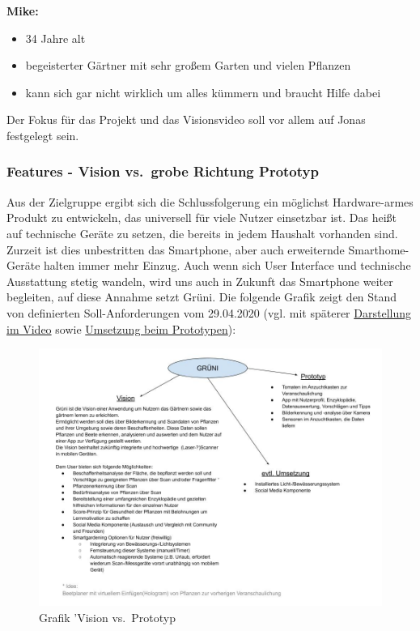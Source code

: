 \textbf{Mike:}

\begin{itemize}
\tightlist
\item
  34 Jahre alt
\item
  begeisterter Gärtner mit sehr großem Garten und vielen Pflanzen
\item
  kann sich gar nicht wirklich um alles kümmern und braucht Hilfe dabei
\end{itemize}

Der Fokus für das Projekt und das Visionsvideo soll vor allem auf Jonas
festgelegt sein.

\hypertarget{features1}{%
\subsubsection{Features - Vision vs.~grobe Richtung
Prototyp}\label{features1}}

Aus der Zielgruppe ergibt sich die Schlussfolgerung ein möglichst
Hardware-armes Produkt zu entwickeln, das universell für viele Nutzer
einsetzbar ist. Das heißt auf technische Geräte zu setzen, die bereits
in jedem Haushalt vorhanden sind. Zurzeit ist dies unbestritten das
Smartphone, aber auch erweiternde Smarthome-Geräte halten immer mehr
Einzug. Auch wenn sich User Interface und technische Ausstattung stetig
wandeln, wird uns auch in Zukunft das Smartphone weiter begleiten, auf
diese Annahme setzt Grüni. Die folgende Grafik zeigt den Stand von
definierten Soll-Anforderungen vom 29.04.2020 (vgl. mit späterer
\protect\hyperlink{ux5cux23ux5cux23Interaktionsgestaltung}{Darstellung
im Video} sowie \protect\hyperlink{ux5cux23Umsetzung}{Umsetzung beim
Prototypen}):

\begin{figure}
\centering
\includegraphics{img/Projektthema.jpg}
\caption{Grafik 'Vision vs.~Prototyp}
\end{figure}


